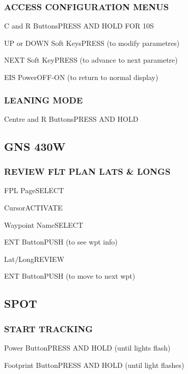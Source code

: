 \begin{multicols}{2}
\subsubsection*{ACCESS CONFIGURATION MENUS}
\begin{enumerate*}
\item C and R Buttons\dotfill PRESS AND HOLD FOR 10S
\item UP or DOWN Soft Keys\dotfill PRESS (to modify parametres)
\item NEXT Soft Key\dotfill PRESS (to advance to next parametre)
\item EIS Power\dotfill OFF-ON (to return to normal display)
\end{enumerate*}

\subsubsection*{LEANING MODE}
\begin{enumerate*}
\item Centre and R Buttons\dotfill PRESS AND HOLD
\end{enumerate*}


\columnbreak %
\subsection*{GNS 430W}
\subsubsection*{REVIEW FLT PLAN LATS \& LONGS}
\begin{enumerate*}
\item FPL Page\dotfill SELECT
\item Cursor\dotfill ACTIVATE
\item Waypoint Name\dotfill SELECT
\item ENT Button\dotfill PUSH (to see wpt info)
\item Lat/Long\dotfill REVIEW
\item ENT Button\dotfill PUSH (to move to next wpt)
\end{enumerate*}

\subsection*{SPOT}
\subsubsection*{START TRACKING}
\begin{enumerate*}
\item Power Button\dotfill PRESS AND HOLD (until lights flash)
\item Footprint Button\dotfill PRESS AND HOLD (until light flashes)
\end{enumerate*}


\end{multicols}
